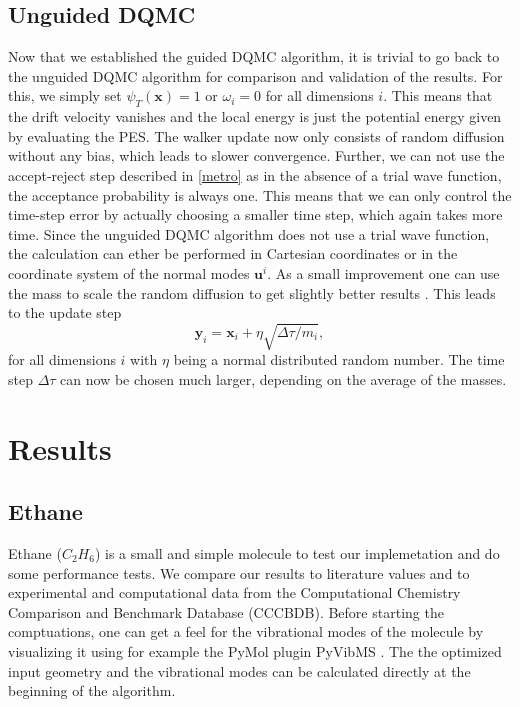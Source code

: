 \documentclass [12pt]{report}
\begin{document}
\section{Unguided DQMC} \label{uDQMC}
Now that we established the guided DQMC algorithm, it is trivial to go back to the unguided DQMC algorithm for comparison and validation of the results. For this, we simply set $\psi_T(\bm{x}) = 1$ or $\omega_i = 0$ for all dimensions $i$. This means that the drift velocity vanishes and the local energy is just the potential energy given by evaluating the PES. The walker update now only consists of random diffusion without any bias, which leads to slower convergence. Further, we can not use the accept-reject step described in \ref{metro} as in the absence of a trial wave function, the acceptance probability is always one. This means that we can only control the time-step error by actually choosing a smaller time step, which again takes more time. Since the unguided DQMC algorithm does not use a trial wave function, the calculation can ether be performed in Cartesian coordinates or in the coordinate system of the normal modes $\bm{u}^i$. As a small improvement one can use the mass to scale the random diffusion to get slightly better results \cite{mccoy}. This leads to the update step
\begin{equation}
\bm{y}_i = \bm{x}_i + \eta\sqrt{\Delta \tau/m_i},
\end{equation}
for all dimensions $i$ with $\eta$ being a normal distributed random number. The time step $\Delta \tau$ can now be chosen much larger, depending on the average of the masses.

\chapter{Results}

\section{Ethane}

Ethane ($C_2H_6$) is a small and simple molecule to test our implemetation and do some performance tests. We compare our results to literature values\cite{c2h6} and to experimental and computational data from the Computational Chemistry Comparison and Benchmark Database (CCCBDB)\cite{cccbdb}. Before starting the comptuations, one can get a feel for the vibrational modes of the molecule by visualizing it using for example the PyMol plugin PyVibMS \cite{PyVibMS}. The the optimized input geometry and the vibrational modes can be calculated directly at the beginning of the algorithm. 
\end{document}
